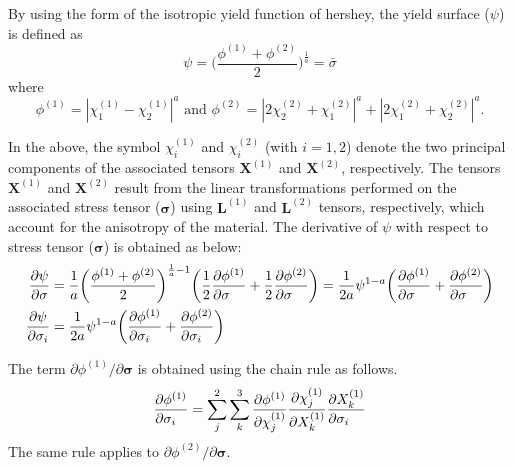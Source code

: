 \documentclass[12pt]{amsart}
\begin{document}
By using the form of the isotropic yield function of hershey, the yield surface ($\psi$) is defined as
\begin{equation}
  \label{eq:hershey}
  \psi=\bigg(\frac{\phi^{(1)} + \phi^{(2)}}{2}\bigg)^{\frac{1}{a}}=\bar{\sigma}
\end{equation}
where
\begin{equation}
  \label{eq:hershey2}
  \phi^{(1)} = |\chi^{(1)}_1-\chi^{(1)}_2|^a \text{ and } \phi^{(2)}=|2\chi^{(2)}_2+\chi^{(2)}_1|^a+|2\chi^{(2)}_1+\chi^{(2)}_2|^a.
\end{equation}

In the above, the symbol $\chi^{(1)}_i$ and $\chi^{(2)}_i$ (with $i=1,2$) denote the two principal components of the associated tensors $\mathbf{X}^{(1)}$ and $\mathbf{X}^{(2)}$, respectively.
The tensors $\mathbf{X}^{(1)}$ and $\mathbf{X}^{(2)}$ result from the linear transformations performed on the associated stress tensor ($\mathbf{\sigma}$) using $\mathbf{L}^{(1)}$ and $\mathbf{L}^{(2)}$ tensors, respectively, which account for the anisotropy of the material.
The derivative of $\psi$ with respect to stress tensor ($\mathbf{\sigma}$) is obtained as below:
\begin{equation}
  \label{eq:derivative1}
  \begin{split}
    \frac{\partial\psi}{\partial\mathbf{\sigma}}&=\frac{1}{a}\bigg(\frac{\phi^{(1)}+\phi^{(2)}}{2}\bigg)^{\frac{1}{a}-1}\bigg(\frac{1}{2}\frac{\partial\phi^{(1)}}{\partial\mathbf{\sigma}\hfill}+\frac{1}{2}\frac{\partial\phi^{(2)}}{\partial\mathbf{\sigma}\hfill}\bigg)=\frac{1}{2a}\psi^{1-a}\bigg(\frac{\partial\phi^{(1)}}{\partial\mathbf{\sigma}\hfill}+\frac{\partial\phi^{(2)}}{\partial\mathbf{\sigma}\hfill}\bigg)\\
    \frac{\partial\psi}{\partial\sigma_i}&=\frac{1}{2a}\psi^{1-a}\bigg(\frac{\partial\phi^{(1)}}{\partial\sigma_i\hfill}+\frac{\partial\phi^{(2)}}{\partial\sigma_i\hfill}\bigg)
  \end{split}
\end{equation}

The term $\partial\phi^{(1)}/\partial\mathbf{\sigma}$ is obtained using the chain rule as follows.
\begin{equation}
  \label{eq:derivative1_1}
  \frac{\partial\phi^{(1)}}{\partial\sigma_i\hfill}=\sum_j^2\sum_k^3 \frac{\partial\phi^{(1)}}{\partial\chi^{(1)}_j}  \frac{\partial\chi^{(1)}_j}{\partial X^{(1)}_k}   \frac{\partial X^{(1)}_k}{\partial\sigma_i\hfill}
\end{equation}
The same rule applies to $\partial\phi^{(2)}/\partial\mathbf{\sigma}$.
\end{document}
